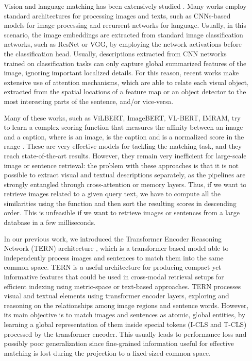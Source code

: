 \documentclass[acmsmall]{acmart}
\newif\ifdraft
\newcommand{\majorrevised}[1]{#1}
\newcommand{\revised}[1]{\ifdraft{\leavevmode\color{blue}{#1}}\else{#1}\fi}
\begin{document}
Vision and language matching has been extensively studied \cite{vsepp2018faghri,carrara2018pictureit,lu2019vilbert,karpathy2015alignment,lee2018stackedcrossattention}.
Many works employ standard architectures for processing images and texts, such as CNNs-based models for image processing and recurrent networks for language.
Usually, in this scenario, the image embeddings are extracted from standard image classification networks, such as ResNet or VGG, by employing the network activations before the classification head. Usually, descriptions extracted from CNN networks trained on classification tasks can only capture global summarized features of the image, ignoring important localized details. \majorrevised{For this reason, recent works make extensive use of attention mechanisms, which are able to relate each visual object, extracted from the spatial locations of a feature map or an object detector to the most interesting parts of the sentence, and/or vice-versa.

\revised{Many of these works, such as ViLBERT\cite{lu2019vilbert}, ImageBERT\cite{qi2020imagebert}, VL-BERT\cite{Su2020VL-BERT}, IMRAM\cite{Chen2020imram}, try to learn a complex scoring function  that measures the affinity between an image and a caption, where  is an image,  is the caption and  is a normalized score in the range . These are very effective models for tackling the matching task, and they reach state-of-the-art results. However, they remain very inefficient for large-scale image or sentence retrieval: the problem with these approaches is that it is not possible to extract visual and textual descriptions separately, as the pipelines are strongly entangled through cross-attention or memory layers. Thus, if we want to retrieve images related to a given query text, we have to compute all the similarities using the  function and then sort the resulting scores in descending order. This is unfeasible if we want to retrieve images or sentences from a large database in a few milliseconds.}}







In our previous work, we introduced the Transformer Encoder Reasoning Network (TERN) architecture \cite{messina2020tern}, which is a transformer-based model able to independently process images and sentences to match them into the same common space. TERN is a useful architecture for producing compact yet informative features that could be used in cross-modal retrieval setups for efficient indexing using metric-space or text-based approaches.
\majorrevised{TERN processes visual and textual elements using transformer encoder layers, exploring and reasoning on the relationships among image regions and sentence words. However, its main objective is to match images and sentences as atomic, global entities, by learning a global representation of them inside special tokens (I-CLS and T-CLS) processed by the transformer encoder.} This usually leads to performance loss \majorrevised{and possibly poor generalization} since fine-grained information useful for effective matching is lost during the projection to a fixed-sized common space.
\end{document}
